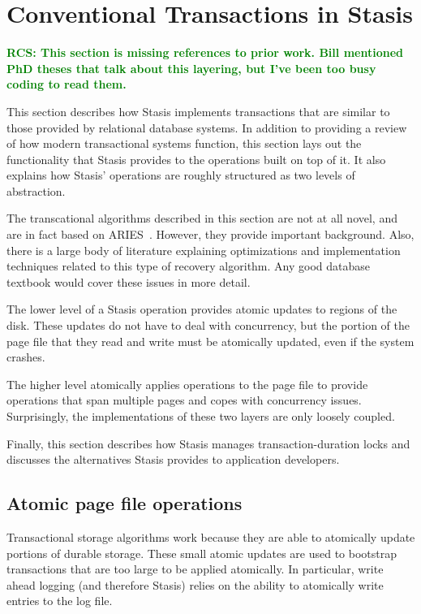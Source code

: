 \documentclass[letterpaper,twocolumn,10pt]{article}
\newcommand{\yad}{Stasis\xspace}
\newcommand{\yads}{Stasis'\xspace}
\newcommand{\rcs}[1]{\textcolor{green}{\bf RCS: #1}}
\begin{document}
\section{Conventional Transactions in \yad}

\rcs{This section is missing references to prior work.  Bill mentioned
PhD theses that talk about this layering, but I've been too busy
coding to read them.}

This section describes how \yad implements transactions that are
similar to those provided by relational database systems.  In addition
to providing a review of how modern transactional systems function,
this section lays out the functionality that \yad provides to the
operations built on top of it.  It also explains how \yads
operations are roughly structured as two levels of abstraction.  

The transcational algorithms described in this section are not at all
novel, and are in fact based on ARIES~\cite{aries}.  However, they
provide important background.  Also, there is a large body of literature
explaining optimizations and implementation techniques related to this
type of recovery algorithm.  Any good database textbook would cover these
issues in more detail.

The lower level of a \yad operation provides atomic
updates to regions of the disk.  These updates do not have to deal
with concurrency, but the portion of the page file that they read and
write must be atomically updated, even if the system crashes.

The higher level atomically applies operations
to the page file to provide operations that span multiple pages and
copes with concurrency issues.  Surprisingly, the implementations
of these two layers are only loosely coupled.

Finally, this section describes how \yad manages transaction-duration
locks and discusses the alternatives \yad provides to application developers.

\subsection{Atomic page file operations}

Transactional storage algorithms work because they are able to
atomically update portions of durable storage.  These small atomic
updates are used to bootstrap transactions that are too large to be
applied atomically.  In particular, write ahead logging (and therefore
\yad) relies on the ability to atomically write entries to the log
file.
\end{document}
